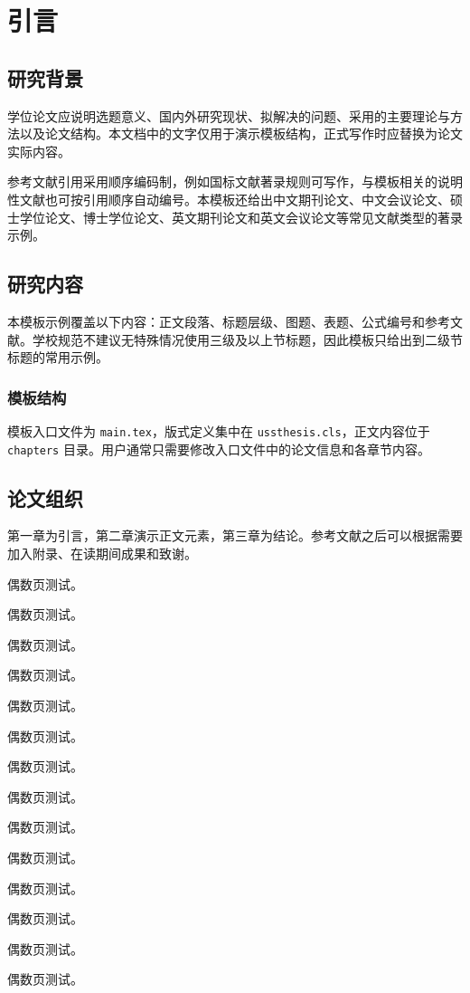 \chapter{引言}

\section{研究背景}

学位论文应说明选题意义、国内外研究现状、拟解决的问题、采用的主要理论与方法以及论文结构。本文档中的文字仅用于演示模板结构，正式写作时应替换为论文实际内容。

参考文献引用采用顺序编码制，例如国标文献著录规则可写作\cite{gbt7714-2015}，与模板相关的说明性文献也可按引用顺序自动编号\cite{lamport1994latex}。本模板还给出中文期刊论文\cite{zhang2024article}、中文会议论文\cite{li2023conference}、硕士学位论文\cite{wang2022master}、博士学位论文\cite{chen2021phd}、英文期刊论文\cite{smith2024englisharticle}和英文会议论文\cite{johnson2023englishconference}等常见文献类型的著录示例。

\section{研究内容}

本模板示例覆盖以下内容：正文段落、标题层级、图题、表题、公式编号和参考文献。学校规范不建议无特殊情况使用三级及以上节标题，因此模板只给出到二级节标题的常用示例。

\subsection{模板结构}

模板入口文件为 \verb|main.tex|，版式定义集中在 \verb|ussthesis.cls|，正文内容位于 \verb|chapters| 目录。用户通常只需要修改入口文件中的论文信息和各章节内容。

\section{论文组织}

第一章为引言，第二章演示正文元素，第三章为结论。参考文献之后可以根据需要加入附录、在读期间成果和致谢。

偶数页测试。

偶数页测试。

偶数页测试。

偶数页测试。

偶数页测试。

偶数页测试。

偶数页测试。

偶数页测试。

偶数页测试。

偶数页测试。

偶数页测试。

偶数页测试。

偶数页测试。

偶数页测试。